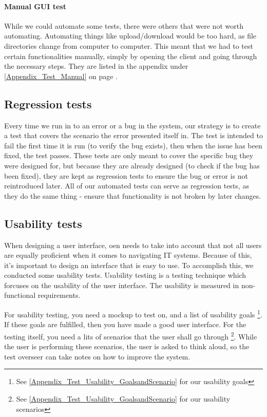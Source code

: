 \paragraph{Manual GUI test}
While we could automate some tests, there were others that were not worth automating. Automating things like upload/download would be too hard, as file directories change from computer to computer. This meant that we had to test certain functionalities manually, simply by opening the client and going through the necessary steps. They are listed in the appendix under \ref{Appendix_Test_Manual} on page \pageref{Appendix_Test_Manual}.

\subsection{Regression tests}
\label{Testing_Strategy_Regression}
Every time we run in to an error or a bug in the system, our strategy is to create a test that covers the scenario the error presented itself in. The test is intended to fail the first time it is run (to verify the bug exists), then when the issue has been fixed, the test passes. 
These tests are only meant to cover the specific bug they were designed for, but because they are already designed (to check if the bug has been fixed), they are kept as regression tests to ensure the bug or error is not reintroduced later. All of our automated tests can serve as regression tests, as they do the same thing - ensure that functionality is not broken by later changes.

\subsection{Usability tests}
\label{Testing_Strategy_Usability}
When designing a user interface, oen needs to take into account that not all users are equally proficient when it comes to navigating IT systems. Because of this, it's important to design an interface that is easy to use. To accomplish this, we conducted some usability tests. Usability testing is a testing technique which forcuses on the usability of the user interface. The usability is measured in non-functional requirements.

For usability testing, you need a mockup to test on, and a list of usability goals \footnote{See \ref{Appendix_Test_Usability_GoalsandScenario} for our usability goals}. If these goals are fulfilled, then you have made a good user interface. For the testing itself, you need a lits of scenarios that the user shall go through \footnote{See \ref{Appendix_Test_Usability_GoalsandScenario} for our usability scenarios}. While the user is performing these scenarios, the user is asked to think aloud, so the test overseer can take notes on how to improve the system.

